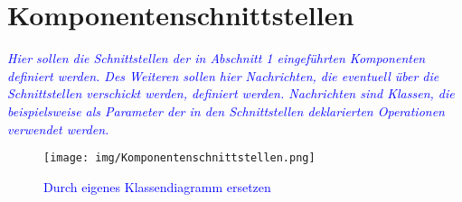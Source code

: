 \section{Komponentenschnittstellen}
\textcolor{blue}{\textit{Hier sollen die Schnittstellen der in Abschnitt 1 eingeführten Komponenten definiert werden. Des Weiteren sollen hier Nachrichten, die eventuell  über die Schnittstellen verschickt werden, definiert werden. Nachrichten sind Klassen, die beispielsweise als Parameter der in den Schnittstellen deklarierten Operationen verwendet werden.
}}

\begin{figure}[H]
\centering
\texttt{[image: img/Komponentenschnittstellen.png]}
\caption{\textcolor{blue}{Durch eigenes Klassendiagramm ersetzen}}
\label{Komponentenschnittstellen}
\end{figure}
